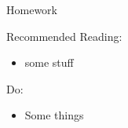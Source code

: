 \documentclass{beamer}
\begin{document}
\begin{frame}[fragile]{Homework}

Recommended Reading:
\begin{itemize}
  \item some stuff
\end{itemize}

Do:
\begin{itemize}
    \item Some things    
\end{itemize}

\end{frame}
\end{document}
